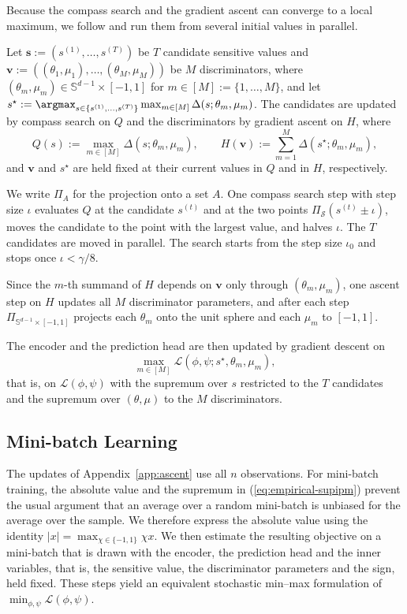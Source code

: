 \documentclass{article} %
\begin{document}
Because the compass search and the gradient ascent can converge to a local maximum, we follow \citet{park2026relu} and run them from several initial values in parallel.

Let $\mathbf{s}:=(s^{(1)},\ldots,s^{(T)})$ be $T$ candidate sensitive values and $\mathbf{v}:=((\theta_1,\mu_1),\ldots,(\theta_M,\mu_M))$ be $M$ discriminators, where $(\theta_m,\mu_m)\in\mathbb{S}^{d-1}\times[-1,1]$ for $m\in[M]:=\{1,\ldots,M\}$, and let $s^{\star}:=\argmax_{s\in\{s^{(1)},\ldots,s^{(T)}\}}\max_{m\in[M]}\Delta(s;\theta_m,\mu_m)$.  The candidates are updated by compass search on $Q$ and the discriminators by gradient ascent on $H$, where
\begin{equation}
  Q(s):=\max_{m\in[M]}\Delta(s;\theta_m,\mu_m),
  \qquad
  H(\mathbf{v}):=\sum_{m=1}^{M}\Delta(s^{\star};\theta_m,\mu_m),
  \label{eq:stacked-objectives}
\end{equation}
and $\mathbf{v}$ and $s^{\star}$ are held fixed at their current values in $Q$ and in $H$, respectively.

We write $\Pi_{A}$ for the projection onto a set $A$.  One compass search step with step size $\iota$ evaluates $Q$ at the candidate $s^{(t)}$ and at the two points $\Pi_{\mathcal{S}}(s^{(t)}\pm\iota)$, moves the candidate to the point with the largest value, and halves $\iota$.  The $T$ candidates are moved in parallel.  The search starts from the step size $\iota_0$ and stops once $\iota<\gamma/8$.

Since the $m$-th summand of $H$ depends on $\mathbf{v}$ only through $(\theta_m,\mu_m)$, one ascent step on $H$ updates all $M$ discriminator parameters, and after each step $\Pi_{\mathbb{S}^{d-1}\times[-1,1]}$ projects each $\theta_m$ onto the unit sphere and each $\mu_m$ to $[-1,1]$.

The encoder and the prediction head are then updated by gradient descent on
\[
  \max_{m\in[M]}\mathcal{L}(\phi,\psi;s^{\star},\theta_m,\mu_m),
\]
that is, on $\mathcal{L}(\phi,\psi)$ with the supremum over $s$ restricted to the $T$ candidates and the supremum over $(\theta,\mu)$ to the $M$ discriminators.

\subsection{Mini-batch Learning}
\label{app:mini-batch}

The updates of Appendix~\ref{app:ascent} use all $n$ observations.  For mini-batch training, the absolute value and the supremum in (\ref{eq:empirical-supipm}) prevent the usual argument that an average over a random mini-batch is unbiased for the average over the sample.
We therefore express the absolute value using the identity $|x|=\max_{\chi\in\{-1,1\}}\chi x$.
We then estimate the resulting objective on a mini-batch that is drawn with the encoder, the prediction head and the inner variables, that is, the sensitive value, the discriminator parameters and the sign, held fixed.
These steps yield an equivalent stochastic min--max formulation of $\min_{\phi,\psi}\mathcal{L}(\phi,\psi)$.
\end{document}
